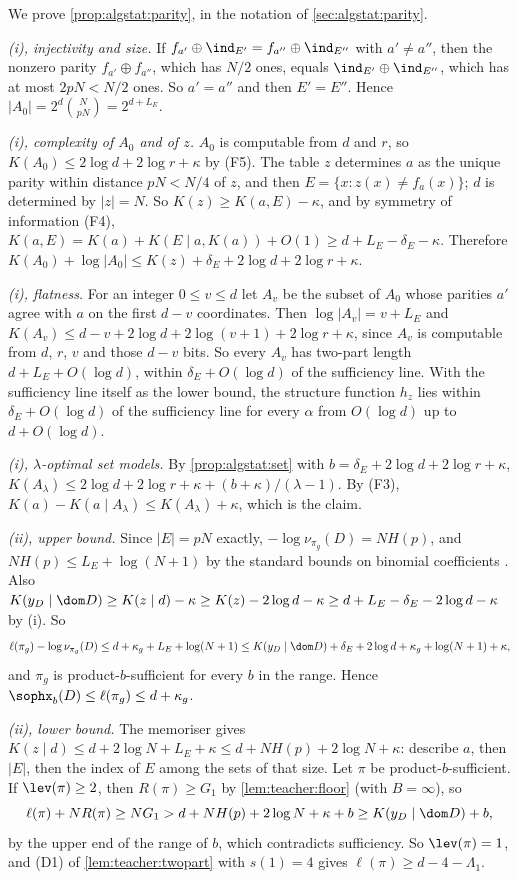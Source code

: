 We prove \cref{prop:algstat:parity}, in the notation of \cref{sec:algstat:parity}.

\emph{(i), injectivity and size.} If $f_{a'}\oplus\ind_{E'}=f_{a''}\oplus\ind_{E''}$ with $a'\ne a''$, then the nonzero parity $f_{a'}\oplus f_{a''}$, which has $N/2$ ones, equals $\ind_{E'}\oplus\ind_{E''}$, which has at most $2pN<N/2$ ones. So $a'=a''$ and then $E'=E''$. Hence $|A_0|=2^d\binom N{pN}=2^{d+L_E}$.

\emph{(i), complexity of $A_0$ and of $z$.} $A_0$ is computable from $d$ and $r$, so $K(A_0)\le2\log d+2\log r+\kappa$ by (F5). The table $z$ determines $a$ as the unique parity within distance $pN<N/4$ of $z$, and then $E=\{x:z(x)\ne f_a(x)\}$; $d$ is determined by $|z|=N$. So $K(z)\ge K(a,E)-\kappa$, and by symmetry of information (F4), $K(a,E)=K(a)+K(E\mid a,K(a))+O(1)\ge d+L_E-\delta_E-\kappa$. Therefore $K(A_0)+\log|A_0|\le K(z)+\delta_E+2\log d+2\log r+\kappa$.

\emph{(i), flatness.} For an integer $0\le v\le d$ let $A_v$ be the subset of $A_0$ whose parities $a'$ agree with $a$ on the first $d-v$ coordinates. Then $\log|A_v|=v+L_E$ and $K(A_v)\le d-v+2\log d+2\log(v+1)+2\log r+\kappa$, since $A_v$ is computable from $d$, $r$, $v$ and those $d-v$ bits. So every $A_v$ has two-part length $d+L_E+O(\log d)$, within $\delta_E+O(\log d)$ of the sufficiency line. With the sufficiency line itself as the lower bound, the structure function $h_z$ lies within $\delta_E+O(\log d)$ of the sufficiency line for every $\alpha$ from $O(\log d)$ up to $d+O(\log d)$.

\emph{(i), $\lambda$-optimal set models.} By \cref{prop:algstat:set} with $b=\delta_E+2\log d+2\log r+\kappa$, $K(A_\lambda)\le2\log d+2\log r+\kappa+(b+\kappa)/(\lambda-1)$. By (F3), $K(a)-K(a\mid A_\lambda)\le K(A_\lambda)+\kappa$, which is the claim.

\emph{(ii), upper bound.} Since $|E|=pN$ exactly, $-\log\nu_{\pi_g}(D)=NH(p)$, and $NH(p)\le L_E+\log(N+1)$ by the standard bounds on binomial coefficients \citep{cover2006elements}. Also $K(y_D\mid\dom D)\ge K(z\mid d)-\kappa\ge K(z)-2\log d-\kappa\ge d+L_E-\delta_E-2\log d-\kappa$ by (i). So
\[
\ell(\pi_g)-\log\nu_{\pi_g}(D)\le d+\kappa_g+L_E+\log(N+1)\le K(y_D\mid\dom D)+\delta_E+2\log d+\kappa_g+\log(N+1)+\kappa,
\]
and $\pi_g$ is product-$b$-sufficient for every $b$ in the range. Hence $\sophx_b(D)\le\ell(\pi_g)\le d+\kappa_g$.

\emph{(ii), lower bound.} The memoriser gives $K(z\mid d)\le d+2\log N+L_E+\kappa\le d+NH(p)+2\log N+\kappa$: describe $a$, then $|E|$, then the index of $E$ among the sets of that size. Let $\pi$ be product-$b$-sufficient. If $\lev(\pi)\ge2$, then $R(\pi)\ge G_1$ by \cref{lem:teacher:floor} (with $B=\infty$), so
\[
\ell(\pi)+NR(\pi)\ge NG_1>d+NH(p)+2\log N+\kappa+b\ge K(y_D\mid\dom D)+b,
\]
by the upper end of the range of $b$, which contradicts sufficiency. So $\lev(\pi)=1$, and (D1) of \cref{lem:teacher:twopart} with $s(1)=4$ gives $\ell(\pi)\ge d-4-\Lambda_1$.

